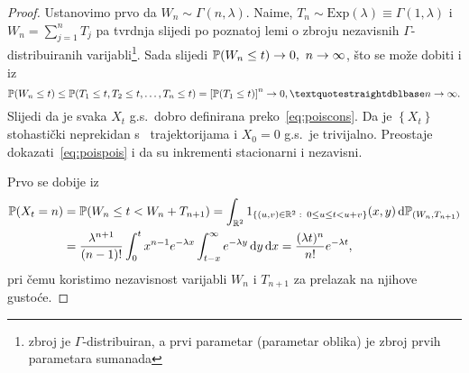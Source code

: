 \documentclass[main.tex]{subfiles}
\begin{document}
\begin{proof}
	Ustanovimo prvo da \( W_n \sim \Gamma(n, \lambda) \). Naime, \( T_n \sim \mathrm{Exp}(\lambda) \equiv \Gamma(1, \lambda) \) i
	\( W_n = \sum_{j=1}^n T_j \) pa tvrdnja slijedi po poznatoj lemi o zbroju nezavisnih \( \Gamma \)-distribuiranih varijabli\footnote{zbroj
		je \( \Gamma \)-distribuiran, a prvi parametar (parametar oblika) je zbroj prvih parametara sumanada}. Sada slijedi \( \mathbb{P}(W_n \le t) \rightarrow 0,\ n \rightarrow \infty \), što se
	može dobiti i iz
	\[
		\P(W_n \le t) \le \P(T_1 \le t, T_2 \le t, \ldots, T_n \le t) = \left[ \P(T_1 \le t) \right]^n \rightarrow 0, \textquotestraightdblbase n \ub.
	\]
	Slijedi da je svaka \( X_t \) g.s.\ dobro definirana preko~\eqref{eq:poiscons}. Da je \( \left\{ X_t \right\} \) stohastički neprekidan
	s \cadlag \ trajektorijama i \( X_0 = 0 \) g.s.\ je trivijalno. Preostaje dokazati~\eqref{eq:poispois} i da su inkrementi stacionarni i nezavisni.

	Prvo se dobije iz
	\begin{align}
		\mathbb{P}(X_t = n) & = \mathbb{P}(W_n \le t < W_n + T_{n+1}) =
		\int_{\mathbb{R}^2} 1_{\left\{ (u, v) \in \mathbb{R}^2 \, \colon \, 0 \le u \le t < u+v \right\}}(x,y) \,\mathrm d \mathbb{P}_{(W_n, T_{n+1})} \\ &= \frac{\lambda^{n+1}}{(n-1)!} \int_0^t x^{n-1}e^{-\lambda x} \int_{t-x}^\infty e^{-\lambda y} \,\mathrm d y \,\mathrm d x
		= \frac{(\lambda t)^n}{n!}e^{-\lambda t},
	\end{align}
	pri čemu koristimo nezavisnost varijabli \( W_n \) i \( T_{n+1} \) za prelazak na njihove gustoće.


\end{proof}
\end{document}
